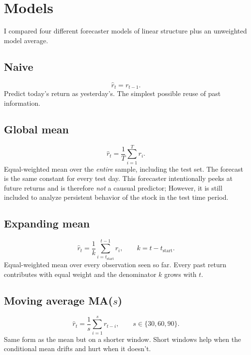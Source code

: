 \documentclass[10pt,a4paper,twocolumn]{article}
\begin{document}
\section{Models}
\label{sec:models}

I compared four different forecaster models of linear structure plus an unweighted model average.

\subsection{Naive}
\begin{equation}
\hat r_t = r_{t-1}.
\label{eq:naive}
\end{equation}
Predict today's return as yesterday's. The simplest possible reuse of past information.

\subsection{Global mean}
\begin{equation}
\hat r_t = \frac{1}{T}\sum_{i = 1}^{T} r_i.
\label{eq:trainmean}
\end{equation}
Equal-weighted mean over the \emph{entire} sample, including the test set. The forecast is the same constant for every test day. This forecaster intentionally peeks at future returns and is therefore \emph{not} a causual predictor; However, it is still included to analyze persistent behavior of the stock in the test time period.

\subsection{Expanding mean}
\begin{equation}
\hat r_t = \frac{1}{k}\sum_{i = t_{\text{start}}}^{t-1} r_i,\qquad k = t - t_{\text{start}}.
\label{eq:expanding}
\end{equation}
Equal-weighted mean over every observation seen so far. Every past return contributes with equal weight and the denominator $k$ grows with $t$.

\subsection{Moving average MA(\texorpdfstring{$s$}{s})}
\begin{equation}
\hat r_t = \frac{1}{s}\sum_{i=1}^{s} r_{t-i},\qquad s \in \{30, 60, 90\}.
\label{eq:ma}
\end{equation}
Same form as the mean but on a shorter window. Short windows help when the conditional mean drifts and hurt when it doesn't.
\end{document}
